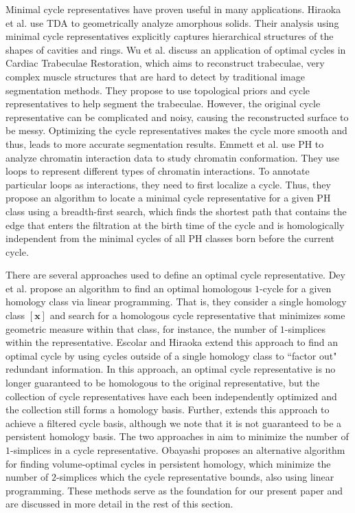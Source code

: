 \documentclass[utf8]{formatting_stuff/frontiersFPHY}
\newcommand{\optimalrep}{\mathbf{x}}
\theoremstyle{plain}
\theoremstyle{definition}
\begin{document}
Minimal cycle representatives have proven  useful in many applications. Hiraoka et al. \cite{Hiraoka7035} use TDA to geometrically analyze amorphous solids. Their analysis using minimal cycle representatives explicitly captures hierarchical structures of the shapes of cavities and rings. Wu et al. \cite{wu} discuss an application of optimal cycles in Cardiac Trabeculae Restoration, which aims to reconstruct trabeculae, very complex muscle structures that are hard to detect by traditional image segmentation methods. They propose to use topological priors and cycle representatives to help segment the trabeculae. However, the original cycle representative can be complicated and noisy, causing the reconstructed surface to be messy. Optimizing the cycle representatives makes the cycle more smooth and thus, leads to more accurate segmentation results. Emmett et al. \cite{emmett2015multiscale} use PH to analyze chromatin interaction data to study chromatin conformation. They use loops to represent different types of chromatin interactions. To annotate particular loops as interactions, they need to first localize a cycle. Thus, they propose an algorithm to locate a minimal cycle representative for a given PH class using a breadth-first search, which finds the shortest path that contains the edge that enters the filtration at the birth time of the cycle and is homologically independent from the minimal cycles of all PH classes born before the current cycle. 

 
There are several approaches used to define an optimal cycle representative. Dey et al. \cite{dey2011optimal} propose an algorithm to find an optimal homologous $1$-cycle for a given homology class via linear programming. That is, they consider a single homology class $[\optimalrep]$ and search for a homologous cycle representative that minimizes some geometric measure within that class, for instance, the number of $1$-simplices within the representative. Escolar and Hiraoka \cite{Escolar2016} extend this approach to find an optimal cycle by using cycles outside of a single homology class to ``factor out" redundant information. In this approach, an optimal cycle representative is no longer guaranteed to be homologous to the original representative, but the collection of cycle representatives have each been independently optimized and the collection still forms a homology basis. Further, \cite{Escolar2016} extends this approach to achieve a filtered cycle basis, although we note that it is not guaranteed to be a persistent homology basis. The two approaches in \cite{dey2011optimal,Escolar2016} aim to minimize the number of $1$-simplices in a cycle representative. Obayashi \cite{Obayashi2018} proposes an alternative algorithm for finding volume-optimal cycles in persistent homology, which minimize the number of $2$-simplices which the cycle representative bounds, also using linear programming. These methods serve as the foundation for our present paper and are discussed in more detail in the rest of this section.  
\end{document}
